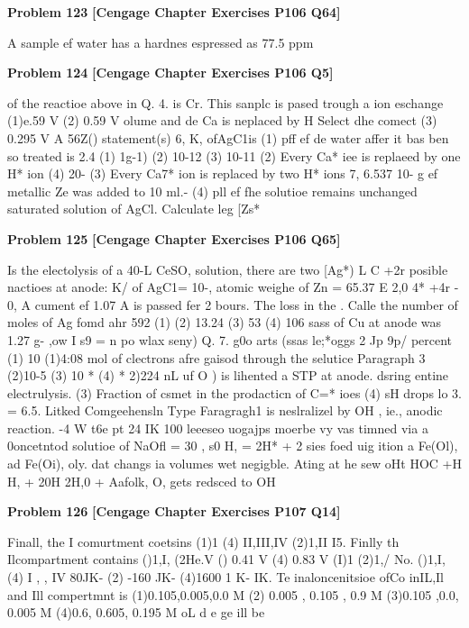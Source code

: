 \begin{problembox}
\textbf{Problem 123} \hfill \textbf{[Cengage Chapter Exercises P106 Q64]}
\label{q:ext-cng-th-123}

A sample ef water has a hardnes espressed as 77.5 ppm
\end{problembox}

\begin{problembox}
\textbf{Problem 124} \hfill \textbf{[Cengage Chapter Exercises P106 Q5]}
\label{q:ext-cng-th-124}

of the reactioe above in Q. 4. is
Cr. This sanplc is pased trough a ion eschange
(1)e.59 V
(2) 0.59 V
olume and de Ca is neplaced by H Select dhe comect
(3) 0.295 V
A 56Z()
statement(s)
6, K, ofAgC1is
(1) pff ef de water affer it bas ben so treated is 2.4
(1) 1g-1)
(2) 10-12
(3) 10-11
(2) Every Ca* iee is replaeed by one H* ion
(4) 20-
(3) Every Ca7* ion is replaced by two H* ions
7, 6.537   10- g ef metallic Ze was added to 10 ml.-
(4) pll ef fhe solutioe remains unchanged
saturated solution of AgCl. Calculate leg
[Zs*
\end{problembox}

\begin{problembox}
\textbf{Problem 125} \hfill \textbf{[Cengage Chapter Exercises P106 Q65]}
\label{q:ext-cng-th-125}

Is the electolysis of a 40-L CeSO, solution, there are two
[Ag*)
L C +2r
posible nactioes at anode:
K/  of AgC1= 10-, atomic weighe of Zn = 65.37
E 2,0  4* +4r - 0,
A cument ef 1.07 A is passed fer 2 bours. The loss in the
. Calle the number of moles of Ag fomd ahr
592 (1)
(2) 13.24
(3) 53
(4) 106
sass of Cu at anode was 1.27 g-
,ow I s9 = n po wlax seny)
Q. 7.
g0o arts (ssas le;*oggs 2 Jp 9p/ percent 
(1) 10 
(1)4:08 mol of clectrons afre gaisod through the selutice
Paragraph 3
(2)10-5
(3) 10 *
(4) *
2)224 nL uf O ) is lihented a STP at anode.
dsring entine electrulysis.
(3) Fraction of csmet in the prodacticn of C=* ioes
(4) sH drops lo 3.
= 6.5.
Litked Comgeehensln Type
Faragragh1
is neslralizel by OH , ie., anodic reaction.
-4 W t6e pt 24 IK 100 leeeseo uogajps moerbe vy
vas timned via a 0oncetntod solutioe of NaOfl = 30 , s0
H, = 2H* + 2
sies foed uig ition a Fe(Ol), ad Fe(Oi), oly.
dat changs ia volumes wet negigble. Ating at he sew
oHt  HOC +H
H, + 20H  2H,0 +
Aafolk, O, gets redsced to OH
\end{problembox}

\begin{problembox}
\textbf{Problem 126} \hfill \textbf{[Cengage Chapter Exercises P107 Q14]}
\label{q:ext-cng-th-126}

Finall, the I comurtment coetsins
(1)1
(4) II,III,IV
(2)1,II
I5. Finlly th Ilcompartment contains
()1,I,
(2He.V
() 0.41 V (4) 0.83 V
(I)1
(2)1,/ No. 
()1,I, 
(4) I ,  , IV
80JK-
(2) -160 JK-
(4)1600 1 K-
IK. Te inaloncenitsioe ofCo inIL,Il and Ill compertmnt is
(1)0.105,0.005,0.0 M
(2) 0.005 , 0.105 , 0.9 M
(3)0.105 ,0.0, 0.005 M
(4)0.6, 0.605, 0.195 M
oL d e ge ill be
\end{problembox}

